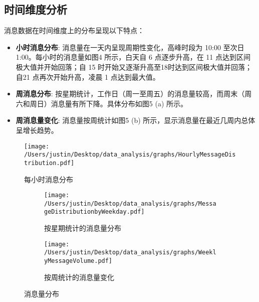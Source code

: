\documentclass{paper}
\begin{document}
\subsection{时间维度分析}

消息数据在时间维度上的分布呈现以下特点：

\begin{itemize}
    \item \textbf{小时消息分布}: 
    消息量在一天内呈现周期性变化，高峰时段为 10:00 至次日 1:00。每小时的消息量如图4 所示，白天自 6 点逐步升高，在 11 点达到区间极大值并开始回落；自 15 时开始又逐渐升高至18时达到区间极大值并回落；自21 点再次开始升高，凌晨 1 点达到最大值。

    \item \textbf{周消息分布}:
    按星期统计，工作日（周一至周五）的消息量较高，而周末（周六和周日）消息量有所下降。具体分布如图5 (a) 所示。

    \item \textbf{周消息量变化}:
    消息量按周统计如图5 (b) 所示，显示消息量在最近几周内总体呈增长趋势。
\end{itemize}

\begin{figure}[H]
    \centering
    \texttt{[image: /Users/justin/Desktop/data\_analysis/graphs/HourlyMessageDistribution.pdf]}
    \caption{每小时消息分布}
    \label{fig:hourly_msg_dist}
\end{figure}
\begin{figure}[H]
    \centering
    \begin{subfigure}[b]{0.45\textwidth}
        \centering
        \texttt{[image: /Users/justin/Desktop/data\_analysis/graphs/MessageDistributionbyWeekday.pdf]}
        \caption{按星期统计的消息量分布}
        \label{fig:weekday_msg_dist}
    \end{subfigure}
    \hfill
    \begin{subfigure}[b]{0.45\textwidth}
        \centering
        \texttt{[image: /Users/justin/Desktop/data\_analysis/graphs/WeeklyMessageVolume.pdf]}
        \caption{按周统计的消息量变化}
        \label{fig:weekly_msg_vol}
    \end{subfigure}
    \caption{消息量分布}
    \label{fig:msg_dist}
\end{figure}
\end{document}
